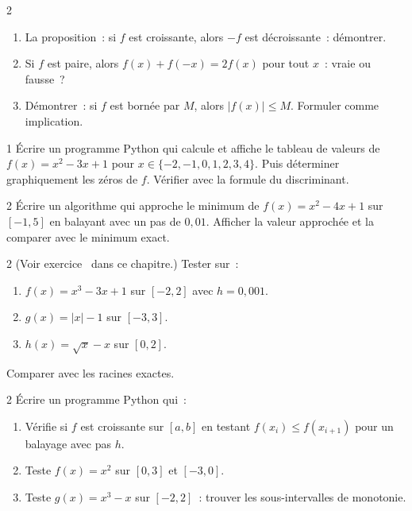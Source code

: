 \begin{exo}{2}
\begin{enumerate}
  \item La proposition~: \og si $f$ est croissante, alors $-f$ est d\'ecroissante\fg~:
        d\'emontrer.
  \item \og Si $f$ est paire, alors $f(x)+f(-x)=2f(x)$ pour tout $x$\fg~:
        vraie ou fausse~?
  \item D\'emontrer~: si $f$ est born\'ee par $M$, alors $|f(x)|\leq M$.
        Formuler comme implication.
\end{enumerate}
\end{exo}

\begin{exo}{1}
\'Ecrire un programme Python qui calcule et affiche le tableau de valeurs
de $f(x)=x^2-3x+1$ pour $x\in\{-2,-1,0,1,2,3,4\}$.
Puis d\'eterminer graphiquement les z\'eros de $f$.
V\'erifier avec la formule du discriminant.
\end{exo}

\begin{exo}{2}
\'Ecrire un algorithme qui approche le minimum de $f(x)=x^2-4x+1$
sur $[-1,5]$ en balayant avec un pas de $0{,}01$.
Afficher la valeur approch\'ee et la comparer avec le minimum exact.
\end{exo}

\begin{exo}{2}
(Voir exercice \logicoalgo\ dans ce chapitre.)
Tester sur~:
\begin{enumerate}
  \item $f(x)=x^3-3x+1$ sur $[-2,2]$ avec $h=0{,}001$.
  \item $g(x)=|x|-1$ sur $[-3,3]$.
  \item $h(x)=\sqrt{x}-x$ sur $[0,2]$.
\end{enumerate}
Comparer avec les racines exactes.
\end{exo}

\begin{exo}{2}
\'Ecrire un programme Python qui~:
\begin{enumerate}
  \item V\'erifie si $f$ est croissante sur $[a,b]$ en testant
        $f(x_i)\leq f(x_{i+1})$ pour un balayage avec pas $h$.
  \item Teste $f(x)=x^2$ sur $[0,3]$ et $[-3,0]$.
  \item Teste $g(x)=x^3-x$ sur $[-2,2]$~: trouver les sous-intervalles
        de monotonie.
\end{enumerate}
\end{exo}

